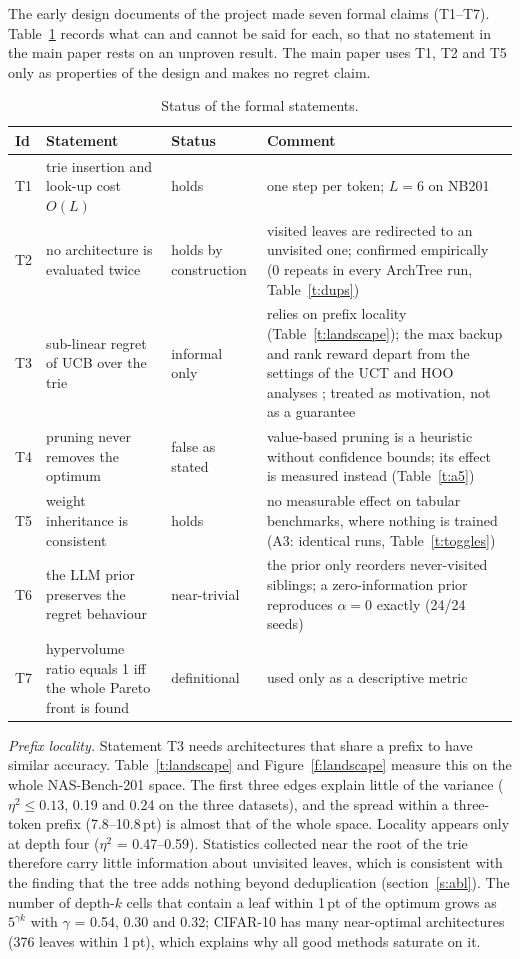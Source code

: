 \documentclass{sadhana}
\newcommand{\algname}{ArchTree}
\begin{document}
The early design documents of the project made seven formal claims (T1--T7). Table~\ref{t:theory} records what can and cannot be said for each, so that no statement in the main paper rests on an unproven result. The main paper uses T1, T2 and T5 only as properties of the design and makes no regret claim.

\begin{table}[tbp]
\caption{Status of the formal statements.}\label{t:theory}
\centering\footnotesize
\begin{tabular}{@{}l>{\raggedright\arraybackslash}p{}l>{\raggedright\arraybackslash}p{}@{}}
\toprule
Id & Statement & Status & Comment\\
\midrule
T1 & trie insertion and look-up cost $O(L)$ & holds & one step per token; $L=6$ on NB201\\
T2 & no architecture is evaluated twice & holds by construction & visited leaves are redirected to an unvisited one; confirmed empirically (0 repeats in every \algname{} run, Table~\ref{t:dups})\\
T3 & sub-linear regret of UCB over the trie & informal only & relies on prefix locality (Table~\ref{t:landscape}); the max backup and rank reward depart from the settings of the UCT and HOO analyses \cite{kocsis2006,coquelin2007,bubeck2011}; treated as motivation, not as a guarantee\\
T4 & pruning never removes the optimum & false as stated & value-based pruning is a heuristic without confidence bounds; its effect is measured instead (Table~\ref{t:a5})\\
T5 & weight inheritance is consistent & holds & no measurable effect on tabular benchmarks, where nothing is trained (A3: identical runs, Table~\ref{t:toggles})\\
T6 & the LLM prior preserves the regret behaviour & near-trivial & the prior only reorders never-visited siblings; a zero-information prior reproduces $\alpha=0$ exactly (24/24 seeds)\\
T7 & hypervolume ratio equals 1 iff the whole Pareto front is found & definitional & used only as a descriptive metric\\
\bottomrule
\end{tabular}
\end{table}

\textit{Prefix locality.} Statement T3 needs architectures that share a prefix to have similar accuracy. Table~\ref{t:landscape} and Figure~\ref{f:landscape} measure this on the whole NAS-Bench-201 space. The first three edges explain little of the variance ($\eta^2\le 0.13$, 0.19 and 0.24 on the three datasets), and the spread within a three-token prefix (7.8--10.8\,pt) is almost that of the whole space. Locality appears only at depth four ($\eta^2$ = 0.47--0.59). Statistics collected near the root of the trie therefore carry little information about unvisited leaves, which is consistent with the finding that the tree adds nothing beyond deduplication (section~\ref{s:abl}). The number of depth-$k$ cells that contain a leaf within 1\,pt of the optimum grows as $5^{\gamma k}$ with $\gamma$ = 0.54, 0.30 and 0.32; CIFAR-10 has many near-optimal architectures (376 leaves within 1\,pt), which explains why all good methods saturate on it.
\end{document}

